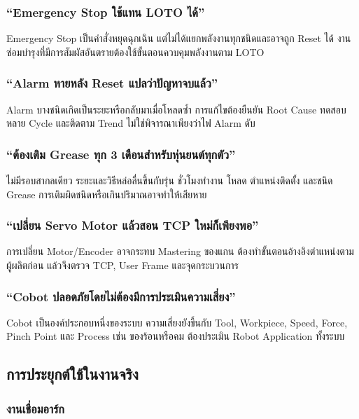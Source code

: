 \subsubsection{“Emergency Stop ใช้แทน LOTO ได้”}

Emergency Stop เป็นคำสั่งหยุดฉุกเฉิน แต่ไม่ได้แยกพลังงานทุกชนิดและอาจถูก Reset ได้ งานซ่อมบำรุงที่มีการสัมผัสอันตรายต้องใช้ขั้นตอนควบคุมพลังงานตาม LOTO

\subsubsection{“Alarm หายหลัง Reset แปลว่าปัญหาจบแล้ว”}

Alarm บางชนิดเกิดเป็นระยะหรือกลับมาเมื่อโหลดซ้ำ การแก้ไขต้องยืนยัน Root Cause ทดสอบหลาย Cycle และติดตาม Trend ไม่ใช่พิจารณาเพียงว่าไฟ Alarm ดับ

\subsubsection{“ต้องเติม Grease ทุก 3 เดือนสำหรับหุ่นยนต์ทุกตัว”}

ไม่มีรอบสากลเดียว ระยะและวิธีหล่อลื่นขึ้นกับรุ่น ชั่วโมงทำงาน โหลด ตำแหน่งติดตั้ง และชนิด Grease การเติมผิดชนิดหรือเกินปริมาณอาจทำให้เสียหาย

\subsubsection{“เปลี่ยน Servo Motor แล้วสอน TCP ใหม่ก็เพียงพอ”}

การเปลี่ยน Motor/Encoder อาจกระทบ Mastering ของแกน ต้องทำขั้นตอนอ้างอิงตำแหน่งตามผู้ผลิตก่อน แล้วจึงตรวจ TCP, User Frame และจุดกระบวนการ

\subsubsection{“Cobot ปลอดภัยโดยไม่ต้องมีการประเมินความเสี่ยง”}

Cobot เป็นองค์ประกอบหนึ่งของระบบ ความเสี่ยงยังขึ้นกับ Tool, Workpiece, Speed, Force, Pinch Point และ Process เช่น ของร้อนหรือคม ต้องประเมิน Robot Application ทั้งระบบ



\subsection{การประยุกต์ใช้ในงานจริง}

\subsubsection{งานเชื่อมอาร์ก}

